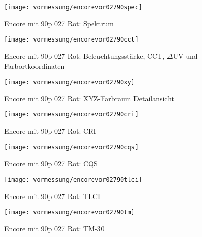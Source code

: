 \documentclass[pagesize,paper=A4,fontsize=12pt,utf8,numbers=noenddot,bibliography=totoc,listof=totoc,DIV=11,BCOR=1mm]{scrreprt}
\begin{document}
\begin{figure}[htp]     %
\centering
\texttt{[image: vormessung/encorevor02790spec]} 
\caption {Encore mit 90p 027 Rot: Spektrum} 
\end{figure}

\begin{figure}[htp]     %
\centering
\texttt{[image: vormessung/encorevor02790cct]} 
\caption {Encore mit 90p 027 Rot: Beleuchtungsstärke, CCT, $\Delta$UV und Farbortkoordinaten} 
\end{figure}

\begin{figure}[htp]     %
\centering
\texttt{[image: vormessung/encorevor02790xy]} 
\caption {Encore mit 90p 027 Rot: XYZ-Farbraum Detailansicht} 
\end{figure}

\begin{figure}[htp]     %
\centering
\texttt{[image: vormessung/encorevor02790cri]} 
\caption {Encore mit 90p 027 Rot: CRI} 
\end{figure}

\begin{figure}[htp]     %
\centering
\texttt{[image: vormessung/encorevor02790cqs]} 
\caption {Encore mit 90p 027 Rot: CQS} 
\end{figure}

\begin{figure}[htp]     %
\centering
\texttt{[image: vormessung/encorevor02790tlci]} 
\caption {Encore mit 90p 027 Rot: TLCI} 
\end{figure}

\begin{figure}[htp]     %
\centering
\texttt{[image: vormessung/encorevor02790tm]} 
\caption {Encore mit 90p 027 Rot: TM-30} 
\end{figure}
\end{document}
